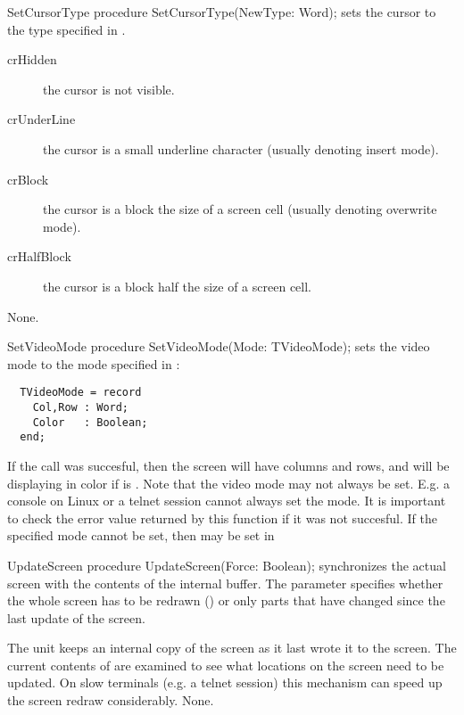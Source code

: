 \begin{procedure}{SetCursorType}
\Declaration
procedure SetCursorType(NewType: Word); 
\Description
{} sets the cursor to the type specified in .
\begin{description}
\item[crHidden] the cursor is not visible.
\item[crUnderLine] the cursor is a small underline character (usually 
denoting insert mode).
\item[crBlock] the cursor is a block the size of a screen cell (usually
denoting overwrite mode).
\item[crHalfBlock] the cursor is a block half the size of a screen cell.
\end{description}
\Errors
None.
\SeeAlso
{}
\end{procedure}

\begin{procedure}{SetVideoMode}
\Declaration
procedure SetVideoMode(Mode: TVideoMode); 
\Description
{} sets the video mode to the mode specified in :
\begin{verbatim}
  TVideoMode = record
    Col,Row : Word;
    Color   : Boolean;
  end;
\end{verbatim}
If the call was succesful, then the screen will have  columns and
 rows, and will be displaying in color if  is
.
Note that the video mode may not always be set. E.g. a console on Linux
or a telnet session cannot always set the mode. It is important to check
the error value returned by this function if it was not succesful.
\Errors
If the specified mode cannot be set, then  may be set
in 
\SeeAlso
\end{procedure}

\begin{procedure}{UpdateScreen}
\Declaration
procedure UpdateScreen(Force: Boolean); 
\Description
{} synchronizes the actual screen with the contents
of the  internal buffer. The parameter 
specifies whether the whole screen has to be redrawn ()
or only parts that have changed since the last update of the screen.

The  unit keeps an internal copy of the screen as it last 
wrote it to the screen. The current contents of  are examined
to see what locations on the screen need to be updated. On slow terminals
(e.g. a \linux telnet session) this mechanism can speed up the screen redraw
considerably.
\Errors
None.
\SeeAlso
{}
\end{procedure}

